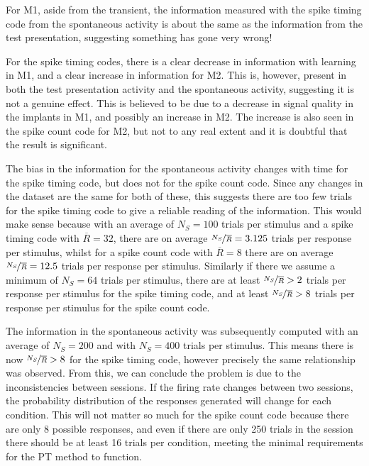 For \ac{M1}, aside from the transient, the information measured with the spike timing code from the spontaneous activity is about the same as the information from the test presentation, suggesting something has gone very wrong!

For the spike timing codes, there is a clear decrease in information with learning in \ac{M1}, and a clear increase in information for \ac{M2}.
This is, however, present in both the test presentation activity and the spontaneous activity, suggesting it is not a genuine effect.
This is believed to be due to a decrease in signal quality in the implants in \ac{M1}, and possibly an increase in \ac{M2}.
The increase is also seen in the spike count code for \ac{M2}, but not to any real extent and it is doubtful that the result is significant.

The bias in the information for the spontaneous activity changes with time for the spike timing code, but does not for the spike count code.
Since any changes in the dataset are the same for both of these, this suggests there are too few trials for the spike timing code to give a reliable reading of the information.
This would make sense because with an average of $N_S = 100$ trials per stimulus and a spike timing code with $\overline{R} = 32$, there are
on average $\nicefrac{N_S}{\overline{R}} = 3.125$ trials per response per stimulus,
whilst for a spike count code with $\overline{R} = 8$ there are on average $\nicefrac{N_S}{\overline{R}} = 12.5$ trials per response per stimulus.
Similarly if there we assume a minimum of $N_S = 64$ trials per stimulus, there are
at least $\nicefrac{N_S}{\overline{R}} > 2$ trials per response per stimulus for the spike timing code, and
at least $\nicefrac{N_S}{\overline{R}} > 8$ trials per response per stimulus for the spike count code.

The information in the spontaneous activity was subsequently computed with an average of $N_S = 200$ and with $N_S = 400$ trials per stimulus.
This means there is now $\nicefrac{N_S}{\overline{R}} > 8$ for the spike timing code, however precisely the same relationship was observed.
From this, we can conclude the problem is due to the inconsistencies between sessions.
If the firing rate changes between two sessions, the probability distribution of the responses generated will change for each condition.
This will not matter so much for the spike count code because there are only 8 possible responses, and even if there are only 250 trials in the session there should be at least 16 trials per condition, meeting the minimal requirements for the \ac{PT} method to function.


